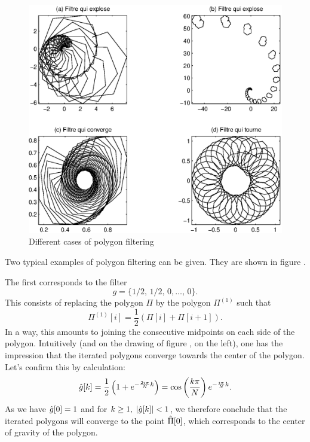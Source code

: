 \begin{figure}[ht] 
    \begin{center}
    \includegraphics[scale=0.6]{images/filtre-polygones-1.eps}
    \end{center}
    \caption{Different cases of polygon filtering}
              \label{fig-filter-polygons-1}
\end{figure}

Two typical examples of polygon filtering can be given. They are shown in figure .
 
\begin{exmp}
 The first corresponds to the filter
\begin{equation*}
g = \{1/2, \, 1/2, \, 0, \ldots, \, 0 \}.
\end{equation*}
This consists of replacing the polygon $ \Pi $ by the polygon $ \Pi^{(1)} $ such that
\begin{equation*}
\Pi^{(1)}[i] = \frac{1}{2} \left(\Pi [i] + \Pi [i + 1] \right).
\end{equation*}
In a way, this amounts to joining the consecutive midpoints on each side of the polygon. Intuitively (and on the drawing of figure , on the left), one has the impression that the iterated polygons converge towards the center of the polygon. Let's confirm this by calculation:
\begin{equation*}
\hat{g}[k] = \frac{1}{2} \left(1 + e^{- \frac{2 \imath \pi}{N} k} \right) = \cos \left(\frac{k \pi}{N} \right) e^{- \frac{\imath \pi}{N} k}.
\end{equation*}
As we have $ \hat{g}[0] = 1 $ and for $ k \geq 1, \; | \hat{g}[k] | <1 $, we therefore conclude that the iterated polygons will converge to the point $ \hat{\Pi}[0] $, which corresponds to the center of gravity of the polygon.
\end{exmp}
 
